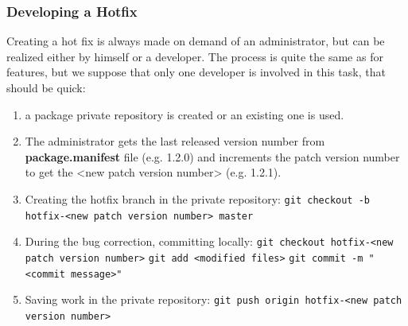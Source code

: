 \documentclass[12pt,a4paper]{article}
\begin{document}
\subsubsection{Developing a Hotfix}

Creating a hot fix is always made on demand of an administrator, but can be realized either by himself or a developer. The process is quite the same as for features, but we suppose that only one developer is involved in this task, that should be quick: 
\begin{enumerate}
\item a package private repository is created or an existing one is used.
\item The administrator gets the last released version number from \textbf{package.manifest} file (e.g. 1.2.0) and increments the patch version number to get the <new patch version number> (e.g. 1.2.1).
\item Creating the hotfix branch in the private repository:
\linebreak  \verb|git checkout -b hotfix-<new patch version number> master|
\item During the bug correction, committing locally:
\linebreak \verb|git checkout hotfix-<new patch version number>|
\linebreak \verb|git add <modified files>|
\linebreak \verb|git commit -m "<commit message>"|
\item Saving work in the private repository:
\linebreak \verb|git push origin hotfix-<new patch version number>|
\end{enumerate}
\end{document}
